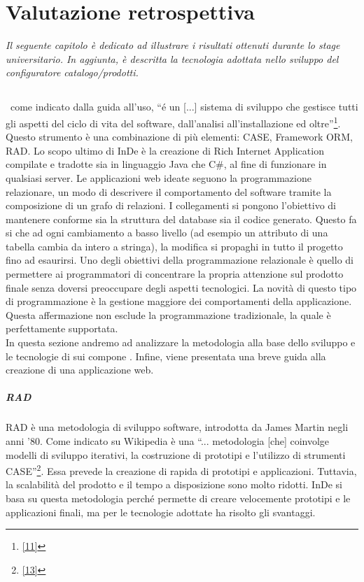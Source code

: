 \chapter{Valutazione retrospettiva}
\textit{Il seguente capitolo è dedicato ad illustrare i risultati ottenuti durante lo stage universitario. In aggiunta, è descritta la tecnologia adottata nello sviluppo del configuratore catalogo/prodotti.}

\section{\inde}
\inde\, come indicato dalla guida all'uso, ``é un [...] sistema di sviluppo che gestisce tutti gli aspetti del ciclo di vita del software, dall'analisi all'installazione ed oltre''\footnote[2]{\hyperref[bib11]{[11]}}.
Questo strumento è una combinazione di più elementi: CASE, Framework ORM, RAD. Lo scopo ultimo di InDe è la creazione di Rich Internet Application compilate e tradotte sia in linguaggio Java che C\#, al fine di funzionare in qualsiasi server.
Le applicazioni web ideate seguono la programmazione relazionare, un modo di descrivere il comportamento del software tramite la composizione di un grafo di relazioni. I collegamenti si pongono l'obiettivo di mantenere conforme sia la struttura del database sia il codice generato. Questo fa si che ad ogni cambiamento a basso livello (ad esempio un attributo di una tabella cambia da intero a stringa), la modifica si propaghi in tutto il progetto fino ad esaurirsi.
Uno degli obiettivi della programmazione relazionale è quello di permettere ai programmatori di concentrare la propria attenzione sul prodotto finale senza doversi preoccupare degli aspetti tecnologici. La novità di questo tipo di programmazione è la gestione maggiore dei comportamenti della applicazione. Questa affermazione non esclude la programmazione tradizionale, la quale è perfettamente supportata.\\

In questa sezione andremo ad analizzare la metodologia alla base dello sviluppo e le tecnologie di sui compone \inde. Infine, viene presentata una breve guida alla creazione di una applicazione web.

\paragraph{RAD}\label{RAD}
RAD è una metodologia di sviluppo software, introdotta da James Martin negli anni '80. Come indicato su Wikipedia è una ``... metodologia [che] coinvolge modelli di sviluppo iterativi, la costruzione di prototipi e l'utilizzo di strumenti CASE''\footnote[3]{\hyperref[bib13]{[13]}}. Essa prevede la creazione di rapida di prototipi e applicazioni. Tuttavia, la scalabilità del prodotto e il tempo a disposizione sono molto ridotti. InDe si basa su questa metodologia perché permette di creare velocemente prototipi e le applicazioni finali, ma per le tecnologie adottate ha risolto gli svantaggi.


